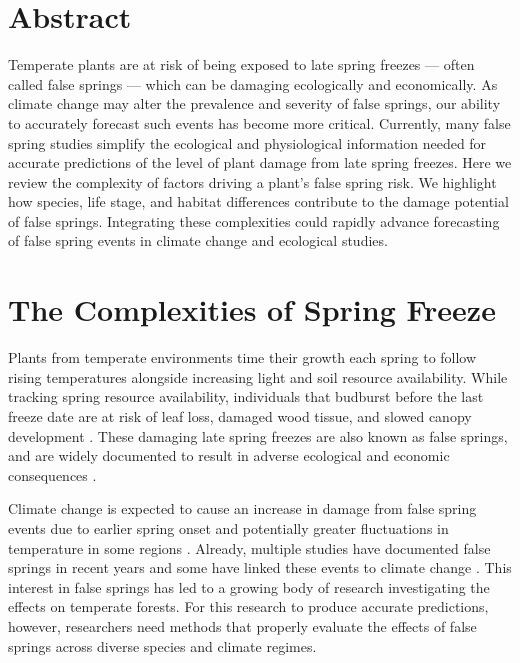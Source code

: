 \documentclass{article}\usepackage[]{graphicx}\usepackage[]{color}
\begin{document}
\section*{Abstract}
Temperate plants are at risk of being exposed to late spring freezes --- often called false springs --- which can be damaging ecologically and economically. As climate change may alter the prevalence and severity of false springs, our ability to accurately forecast such events has become more critical. Currently, many false spring studies simplify the ecological and physiological information needed for accurate predictions of the level of plant damage from late spring freezes. Here we review the complexity of factors driving a plant's false spring risk. We highlight how species, life stage, and habitat differences contribute to the damage potential of false springs. %
Integrating these complexities could rapidly advance forecasting of false spring events in climate change and ecological studies.

\section*{The Complexities of Spring Freeze}

Plants from temperate environments time their growth each spring to follow rising temperatures alongside increasing light and soil resource availability. While tracking spring resource availability, individuals that budburst before the last freeze date are at risk of leaf loss, damaged wood tissue, and slowed canopy development \citep{Gu2008, Hufkens2012}. These damaging late spring freezes are also known as false springs, and are widely documented to result in adverse ecological and economic consequences \citep{Knudson2012, Ault2013}.

Climate change is expected to cause an increase in damage from false spring events due to earlier spring onset and potentially greater fluctuations in temperature in some regions \citep{Inouye2008, Martin2010}. Already, multiple studies have documented false springs in recent years \citep{Gu2008, Augspurger2009, Augspurger2013, Menzel2015} and some have linked these events to climate change \citep{Ault2013, Allstadt2015, Muffler2016, Xin2016, Vitra2017}. This interest in false springs has led to a growing body of research investigating the effects on temperate forests. For this research to produce accurate predictions, however, researchers need methods that properly evaluate the effects of false springs across diverse species and climate regimes. 
\end{document}
